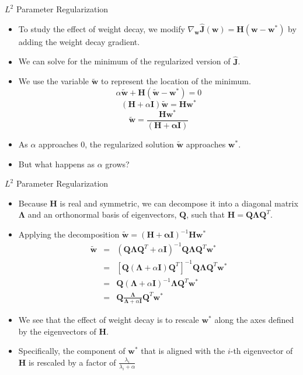 \documentclass[10pt]{beamer}
\begin{document}
	\begin{frame}{$L^2$ Parameter Regularization}
		\begin{itemize}
			\item To study the effect of weight decay, we modify $\nabla_{\bm{w}}\hat{\bm{J}}(\bm{w})=\mathbf{H}(\bm{w}-\bm{w}^*)$ by adding the weight decay gradient.
			\pause
			\item We can solve for the minimum of the regularized version of $\hat{\bm{J}}$.
			\item We use the variable $\tilde{\bm{w}}$ to represent the location of the minimum.
			$$\alpha\tilde{\bm{w}}+\mathbf{H}(\tilde{\bm{w}}-\bm{w}^*)=0$$
			$$(\mathbf{H}+\alpha\mathbf{I})\tilde{\bm{w}}=\mathbf{H}\bm{w}^*$$
			$$\tilde{\bm{w}}=\frac{\mathbf{H}\bm{w}^*}{(\mathbf{H+\alpha\mathbf{I}})}$$
			
			\pause
			\item As $\alpha$ approaches 0, the regularized solution $\tilde{\bm{w}}$ approaches $\bm{w}^*$.
			\item But what happens as $\alpha$ grows?
		\end{itemize}
	\end{frame}
	
	\begin{frame}{$L^2$ Parameter Regularization}
		\begin{itemize}
			\item Because $\mathbf{H}$ is real and symmetric, we can decompose it into a diagonal matrix $\bm{\Lambda}$ and an orthonormal basis of eigenvectors, $\bm{Q}$, such that $\mathbf{H}=\bm{Q\Lambda Q}^T$.
			\pause
			\item Applying the decomposition $\tilde{\bm{w}}=(\mathbf{H+\alpha\mathbf{I}})^{-1}\mathbf{H}\bm{w}^*$
			\begin{eqnarray*}
				\tilde{\bm{w}}&=&(\bm{Q\Lambda Q}^T+\alpha\bm{I})^{-1}\bm{Q\Lambda Q}^T\bm{w}^*\\
				&=&\left[\bm{Q}(\bm{\Lambda}+\alpha\bm{I})\bm{Q}^T\right]^{-1}\bm{Q\Lambda Q}^T\bm{w}^*\\
				&=&\bm{Q}(\bm{\Lambda}+\alpha\bm{I})^{-1}\bm{\Lambda Q}^T\bm{w}^*\\
				&=&\bm{Q}\frac{\bm{\Lambda}}{\bm{\Lambda}+\alpha\bm{I}}\bm{Q}^T\bm{w}^*
			\end{eqnarray*}
			\pause
			\item We see that the effect of weight decay is to rescale $\bm{w}^*$ along the axes defined by the eigenvectors of $\bm{H}$.
			\pause
			\item Specifically, the component of $\bm{w}^*$ that is aligned with the $i$-th eigenvector of $\bm{H}$ is rescaled by a factor of $\frac{\lambda_i}{\lambda_i+\alpha}$
		\end{itemize}
	\end{frame}
\end{document}
